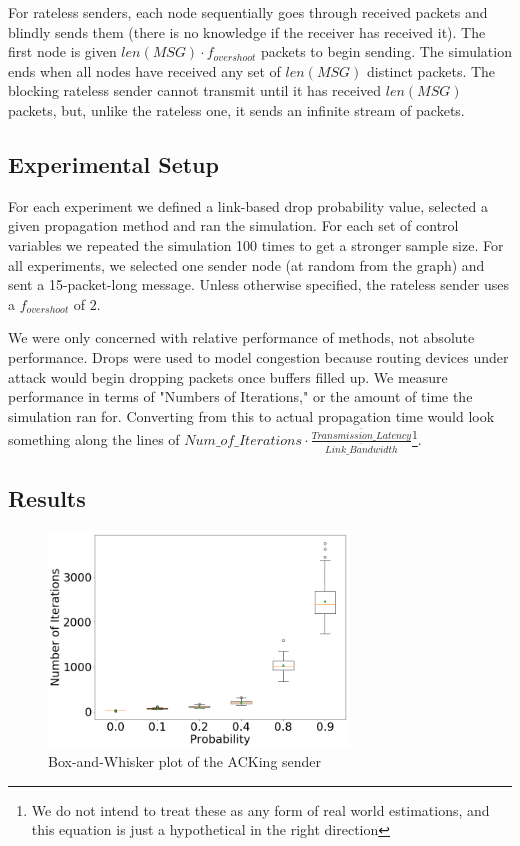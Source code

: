 For rateless senders, each node sequentially goes through received packets and blindly sends them (there is no knowledge if the receiver has received it). The first node is given $len(MSG)\cdot f_{overshoot}$ packets to begin sending. The simulation ends when all nodes have received any set of $len(MSG)$ distinct packets. The blocking rateless sender cannot transmit until it has received $len(MSG)$ packets, but, unlike the rateless one, it sends an infinite stream of packets.

\subsection{Experimental Setup}
For each experiment we defined a link-based drop probability value, selected a given propagation method and ran the simulation. For each set of control variables we repeated the simulation 100 times to get a stronger sample size. For all experiments, we selected one sender node (at random from the graph) and sent a 15-packet-long message. Unless otherwise specified, the rateless sender uses a $f_{overshoot}$ of $2$.

We were only concerned with relative performance of methods, not absolute performance. Drops were used to model congestion because routing devices under attack would begin dropping packets once buffers filled up. We measure performance in terms of "Numbers of Iterations," or the amount of time the simulation ran for. Converting from this to actual propagation time would look something along the lines of $Num\_of\_Iterations\cdot \frac{\overline{Transmission\_Latency}}{\overline{Link\_Bandwidth}}$\footnote{We do not intend to treat these as any form of real world estimations, and this equation is just a hypothetical in the right direction}.

\subsection{Results}

\begin{figure}[tp]
\centering
\noindent
\includegraphics[width=8cm]{figures/ACK_FINAL.png}
\caption{Box-and-Whisker plot of the ACKing sender }
\label{graph:ack}
\end{figure}

